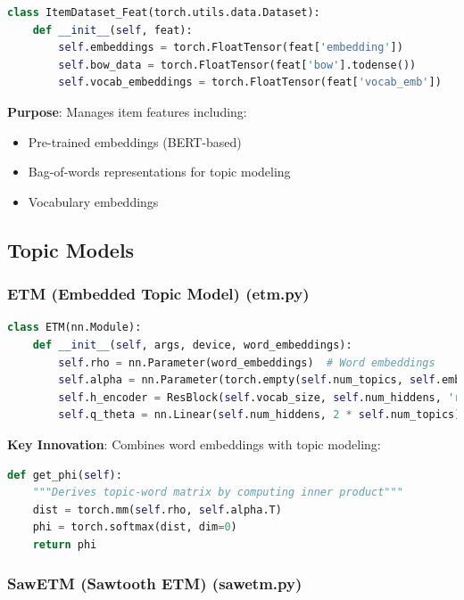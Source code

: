 \begin{lstlisting}[language=Python, caption=Item Dataset Implementation]
class ItemDataset_Feat(torch.utils.data.Dataset):
    def __init__(self, feat):
        self.embeddings = torch.FloatTensor(feat['embedding'])
        self.bow_data = torch.FloatTensor(feat['bow'].todense())
        self.vocab_embeddings = torch.FloatTensor(feat['vocab_emb'])
\end{lstlisting}

\textbf{Purpose}: Manages item features including:
\begin{itemize}
    \item Pre-trained embeddings (BERT-based)
    \item Bag-of-words representations for topic modeling
    \item Vocabulary embeddings
\end{itemize}

\subsection{Topic Models}

\subsubsection{ETM (Embedded Topic Model) (etm.py)}

\begin{lstlisting}[language=Python, caption=ETM Model Architecture]
class ETM(nn.Module):
    def __init__(self, args, device, word_embeddings):
        self.rho = nn.Parameter(word_embeddings)  # Word embeddings
        self.alpha = nn.Parameter(torch.empty(self.num_topics, self.embed_size))  # Topic embeddings
        self.h_encoder = ResBlock(self.vocab_size, self.num_hiddens, 'relu')
        self.q_theta = nn.Linear(self.num_hiddens, 2 * self.num_topics)
\end{lstlisting}

\textbf{Key Innovation}: Combines word embeddings with topic modeling:

\begin{lstlisting}[language=Python, caption=Topic-Word Matrix Derivation]
def get_phi(self):
    """Derives topic-word matrix by computing inner product"""
    dist = torch.mm(self.rho, self.alpha.T)
    phi = torch.softmax(dist, dim=0)
    return phi
\end{lstlisting}

\subsubsection{SawETM (Sawtooth ETM) (sawetm.py)}

